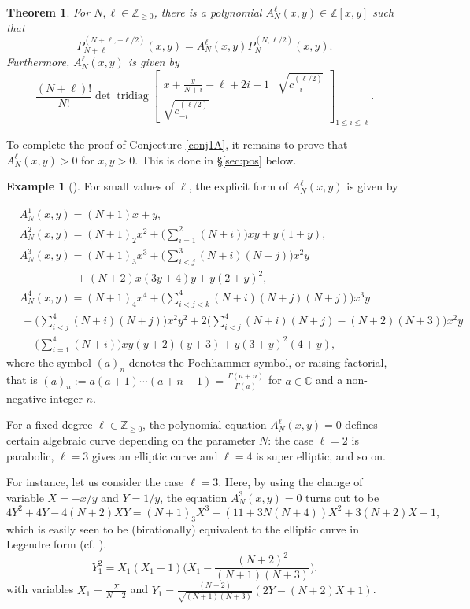 \documentclass[11pt]{article}
\numberwithin{equation}{section}
\newcommand{\Z}{\mathbb{Z}} %
\newcommand{\C}{\mathbb{C}} %
\newcommand{\cp}[2]{P^{(#1)}_{#2}} %
\DeclareMathOperator{\tridiag}{tridiag}
\newcommand{\Tridiag}[4]{\tridiag\mat{#1 & #2 \\ #3}_{#4}}
\newcommand{\mat}[1]{\begin{bmatrix}#1\end{bmatrix}}
\theoremstyle{plain}
\newtheorem{thm}{Theorem}[section]
\theoremstyle{definition}
\newtheorem{ex}{Example}[section]
\theoremstyle{remark}
\begin{document}
\begin{thm} \label{thm:div1}
  For \(N,\ell \in \Z_{\geq 0}\), there is a polynomial \(A_N^\ell(x,y) \in \Z[x,y]\) such that
  \[
    \cp{N+\ell,-\ell/2}{N+\ell}(x,y) = A_N^\ell(x,y) \cp{N,\ell/2}{N}(x,y).
  \]
  Furthermore, \(A_N^\ell(x,y) \) is given by
  \[
    \frac{(N+\ell)!}{N!}\det\Tridiag{x+\frac y{N+i}-\ell+2i-1}{\sqrt{c^{(\ell/2)}_{-i}}}{\sqrt{c^{(\ell/2)}_{-i}}}{1\le i\le \ell}.
  \]
\end{thm}

To complete the proof of Conjecture \ref{conj1A}, it remains to prove that
\(A_N^\ell(x,y) >0 \) for \(x,y>0\). This is done in \S \ref{sec:pos} below.

\begin{ex}[\cite{RW2017}] \label{ex:A1}
For small values of \(\ell\), the explicit form of \(A_N^\ell(x,y) \) is given by

\begin{align*}
  &A^1_N(x,y) = (N+1)x +y,   \\
  &A^2_N(x,y) = (N+1)_2 x^2 + \biggl(\sum_{i=1}^2 (N+i) \biggr)xy + y (1+ y), \\
  &A^3_N(x,y) = (N+1)_3 x^3  + \biggl(\sum_{i<j}^3 (N+i)(N+j) \biggr) x^2 y \\
  & \qquad \qquad \quad      + (N+2)x(3 y+4)y + y (2 + y)^2, \\
  &A^4_N(x,y)  = (N+1)_4 x^4 + \biggl( \sum_{i<j<k}^4 (N+i)(N+j)(N+j) \biggr)x^3 y\\
  &\, + \biggl(\sum_{i<j}^4 (N+i)(N+j) \biggr) x^2 y^2 + 2\biggl( \sum_{i<j}^4 (N+i)(N+j) - (N+2)(N+3) \biggr) x^2 y  \\
  &\,  + \biggl(\sum_{i=1}^4 (N+i) \biggr) xy(y+2)(y+3) + y(3 + y)^2(4 + y),
\end{align*}
where the symbol $(a)_n$ denotes the Pochhammer symbol, or raising factorial, that is
\( (a)_n:= a(a+1)\cdots (a+n-1)=\frac{\Gamma(a+n)}{\Gamma(a)} \) for $a\in\C$ and a non-negative integer $n$.

For a fixed degree \(\ell \in \Z_{\geq 0}\), the polynomial equation \(A_N^\ell(x,y)= 0\) defines certain algebraic curve depending
on the parameter \(N\): the case \(\ell = 2 \) is parabolic, \(\ell = 3 \) gives an elliptic curve and \(\ell = 4\) is super elliptic,
and so on.

For instance, let us consider the case \(\ell = 3\). Here, by using the change of variable $X=-x/y$ and $Y=1/y$,
the equation $A^3_N(x,y)=0$ turns out to be
\[
  4 Y^2 + 4 Y - 4(N+2) X Y = (N+1)_3 X^3 - (11 + 3N( N+4)) X^2 + 3(N+2) X - 1,
\]
which is easily seen to be (birationally) equivalent to the
elliptic curve in Legendre form (cf. \cite{Kob1984}).
\[
  Y_1^2 = X_1(X_1-1)\Big(X_1- \frac{(N+2)^2}{(N+1)(N+3)}\Big).
\]
with variables \(X_1 = \frac{X}{N+2}\) and \(Y_1 = \frac{(N+2)}{\sqrt{(N+1)(N+3)}} (2 Y  - (N+2) X + 1) \).
\end{ex}
\end{document}
